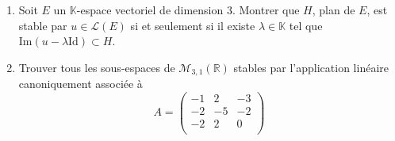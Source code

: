 \documentclass[a4paper,10pt]{report}
\begin{document}
\begin{Exa} \begin{enumerate}
\item Soit $E$ un $\mathbb{K}$-espace vectoriel de dimension $3$. Montrer que $H$, plan de $E$, est stable par $u \in \mathcal{L}(E)$ si et seulement si il existe $\lambda \in \mathbb{K}$ tel que $\textrm{Im}(u- \lambda \textrm{Id}) \subset H$.
\item Trouver tous les sous-espaces de $\mathcal{M}_{3,1}(\mathbb{R})$ stables par l'application linéaire canoniquement associée à 
$$A= \begin{pmatrix}
-1 & 2 & -3 \\
-2 & -5 & -2 \\
-2 & 2 & 0 \\
\end{pmatrix} $$
\end{enumerate}
\end{Exa}
\end{document}
